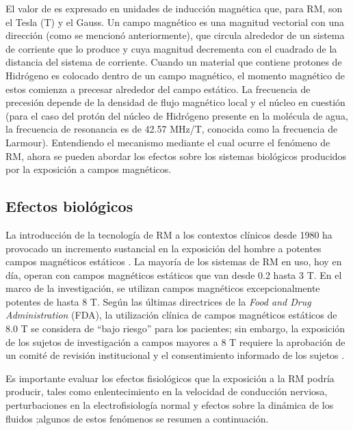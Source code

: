 El valor de \Bzero es expresado en unidades de inducción magnética que, para RM, son el Tesla (T) y el Gauss. Un campo magnético es una magnitud vectorial con una dirección (como se mencionó anteriormente), que circula alrededor de un sistema de corriente que lo produce y cuya magnitud decrementa con el cuadrado de la distancia del sistema de corriente. Cuando un material que contiene protones de Hidrógeno es colocado dentro de un campo magnético, el momento magnético de estos comienza a precesar alrededor del campo estático. La frecuencia de precesión depende de la densidad de flujo magnético local y el núcleo en cuestión  (para el caso del protón del núcleo de Hidrógeno presente en la molécula de agua, la frecuencia de resonancia es de 42.57 MHz/T, conocida como la frecuencia de Larmour). Entendiendo el mecanismo mediante el cual ocurre el fenómeno de RM,  ahora se pueden abordar los efectos sobre los sistemas biológicos producidos por la exposición a campos magnéticos.

\subsection{Efectos biológicos}

La introducción de la tecnología de RM a los contextos clínicos desde 1980 ha provocado un incremento sustancial en la exposición del hombre a potentes campos magnéticos estáticos \cite{Schenck_2000}. La mayoría de los sistemas de RM en uso, hoy en día, operan con campos magnéticos estáticos que van desde 0.2 hasta 3 T. En el marco de la investigación, se utilizan campos magnéticos excepcionalmente potentes de hasta 8 T. Según las últimas directrices de la \emph{Food and Drug Administration} (FDA), la utilización clínica de campos magnéticos estáticos de 8.0 T se considera de ``bajo riesgo'' para los pacientes; sin embargo, la exposición de los sujetos de investigación a campos mayores a 8 T requiere la aprobación de un comité de revisión institucional y el consentimiento informado de los sujetos \cite{Shellock_2000}.

Es importante evaluar los efectos fisiológicos que la exposición a la RM podría producir, tales como enlentecimiento en la velocidad de conducción nerviosa, perturbaciones en la electrofisiología normal y efectos sobre la dinámica de los fluidos \cite{Magin_Liburdy_Persson_1992,HealthProtectionAgency_2008};algunos de estos fenómenos se resumen a continuación. 

